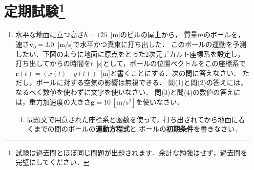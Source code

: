 \documentclass[a4paper,11pt]{ltjsarticle}
\begin{document}
\clearpage

\pagestyle{fancy}
\rhead{}
\cfoot{\thepage}

\section[定期試験]{定期試験\footnote{試験は過去問と{\color{cyan}ほぼ同じ問題が出題}されます．余計な勉強はせず，{\color{cyan}過去問を完璧}にしてください．}}

\begin{enumerate}[label={\LARGE \Roman*}]
    \item 水平な地面に立つ高さ$h=125$\ [m]のビルの屋上から，
    質量$m$のボールを，速さ$\bm{v}_0=3.0$\ [m/s]で水平かつ真東に打ち出した．
    このボールの運動を予測したい．下図のように地面に原点をとった2次元デカルト座標系を設定し，
    打ち出してからの時間を$t$\ [s]として，ボールの位置ベクトルをこの座標系で
    $\bm{r}(t)=(x(t) \quad y(t))$\ [m]と書くことにする．次の問に答えなさい．
    ただし，ボールに対する空気の影響は無視できる．
    問(1)と問(2)の答えには，なるべく数値を使わずに文字を使いなさい．
    問(3)と問(4)の数値の答えには，重力加速度の大きさ$\bm{g}=10\ [\mathrm{m/s^2}]$を使いなさい．


    \begin{center}
    \end{center}

    
    \begin{enumerate}[label=(\arabic*)]
        \item 問題文で用意された座標系と函数を使って，打ち出されてから地面に着くまでの間のボールの\textbf{運動方程式}と
        ボールの\textbf{初期条件}を書きなさい．


\end{enumerate}
\end{enumerate}
\end{document}
